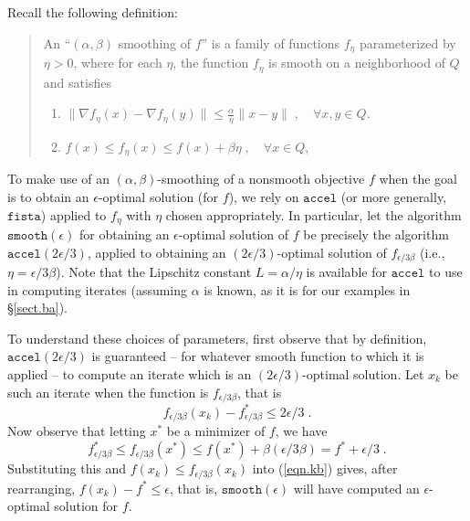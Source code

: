\documentclass[reqno, 11pt]{amsart}
\numberwithin{equation}{section}
\newcommand{\shrink}[1]{ {\scriptstyle {\textstyle {#1} } } }
\newcommand{\smfrac}[2]{ \shrink{ \frac{#1}{#2} } }
\newcommand{\accel}{\mathtt{accel}}
\newcommand{\fista}{\mathtt{fista}}
\newcommand{\smooth}{\mathtt{smooth}}
\newcommand{\grad}{\nabla}
\begin{document}
Recall the following definition:
\begin{quote}
An  ``$ (\alpha, \beta) $ smoothing of $ f $'' is a family of functions $ f_{\eta} $ parameterized by $ \eta > 0 $, where for each $ \eta $, the function $ f_{\eta} $ is smooth on a neighborhood of $ Q $ and satisfies
\begin{enumerate}
\item $ \| \grad f_{\eta}(x) - \grad f_{\eta}(y) \| \leq \smfrac{\alpha }{\eta }  \| x - y \| \; , \quad \forall x,y \in Q $.
\item $ f(x) \leq f_{\eta}(x) \leq f(x) + \beta \eta \; , \quad \forall x \in Q $,
\end{enumerate}
\end{quote}


To make use of an $ (\alpha, \beta) $-smoothing of a nonsmooth objective $ f $ when the goal is to obtain an $ \epsilon $-optimal solution (for $ f $), we rely on $ \accel $ (or more generally, $ \fista $) applied to $ f_{\eta} $ with $ \eta $ chosen appropriately.  In particular, let the algorithm $ \smooth(\epsilon) $ for obtaining an $ \epsilon $-optimal solution of $ f $ be precisely the algorithm $ \accel(2\epsilon/3) $, applied to obtaining an $ (2\epsilon /3) $-optimal solution of $ f_{\epsilon/3\beta} $ (i.e., $ \eta = \epsilon/3\beta $). Note that the Lipschitz constant $ L = \alpha/\eta $ is available for $ \accel $  to use in computing iterates (assuming $ \alpha $ is known, as it is for our examples in \S\ref{sect.ba}).  

To understand these choices of parameters, first observe that by definition, $ \accel(2\epsilon/3 ) $  is guaranteed -- for whatever smooth function to which it is applied -- to compute an iterate which is an $ (2\epsilon/3  ) $-optimal solution.  Let $ x_k $ be such an iterate when the function is $ f_{\epsilon/3 \beta} $, that is  
\begin{equation}  \label{eqn.kb} 
    f_{\epsilon/3 \beta}(x_k) - f^*_{\epsilon /3 \beta} \leq 2 \epsilon /3 \; . 
   \end{equation} 
Now observe that letting $ x^* $ be a minimizer of $ f $, we have
\[  f_{\epsilon/3 \beta}^* \leq f_{\epsilon/3 \beta }(x^*) \leq f(x^*) + \beta ( \epsilon/3 \beta) = f^* + \epsilon/3 \; .   \]
Substituting this and $ f(x_k) \leq f_{\epsilon/3 \beta}(x_k) $ into (\ref{eqn.kb})  gives, after rearranging, $ f(x_k) - f^* \leq \epsilon $, that is, $ \smooth(\epsilon) $ will have computed an $ \epsilon $-optimal solution for $ f $. 
\end{document}
